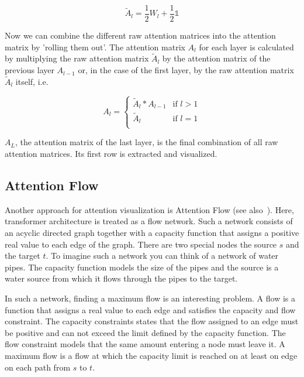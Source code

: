 \documentclass[a4paper]{scrartcl}
\begin{document}
    \begin{equation}
        \tilde{A}_l = \frac{1}{2} W_l + \frac{1}{2} \mathds{1}
    \end{equation}

    Now we can combine the different raw attention matrices into the attention matrix by 'rolling them out'.
    The attention matrix $A_l$ for each layer is calculated by multiplying the raw attention matrix $\tilde{A}_l$ by the attention matrix of the previous layer $A_{l-1}$ or, in the case of the first layer, by the raw attention matrix $\tilde{A}_l$ itself, i.e.

    \begin{equation}
        A_l = \begin{cases}
                  \tilde{A}_l * A_{l-1}& \text{if $l > 1$}\\
                  \tilde{A}_l& \text{if $l = 1$}\\
        \end{cases}\label{eq:_3}
    \end{equation}

    $A_L$, the attention matrix of the last layer, is the final combination of all raw attention matrices.
    Its first row is extracted and visualized.

    \subsection{Attention Flow}\label{subsec:attention-flow}
    Another approach for attention visualization is Attention Flow (see also~\cite{abnar2020quantifying}).
    Here, transformer architecture is treated as a flow network.
    Such a network consists of an acyclic directed graph together with a capacity function that assigns a positive real value to each edge of the graph.
    There are two special nodes the source $s$ and the target $t$.
    To imagine such a network you can think of a network of water pipes.
    The capacity function models the size of the pipes and the source is a water source from which it flows through the pipes to the target.

    In such a network, finding a maximum flow is an interesting problem.
    A flow is a function that assigns a real value to each edge and satisfies the capacity and flow constraint.
    The capacity constraints states that the flow assigned to an edge must be positive and can not exceed the limit defined by the capacity function.
    The flow constraint models that the same amount entering a node must leave it.
    A maximum flow is a flow at which the capacity limit is reached on at least on edge on each path from $s$ to $t$.
\end{document}
